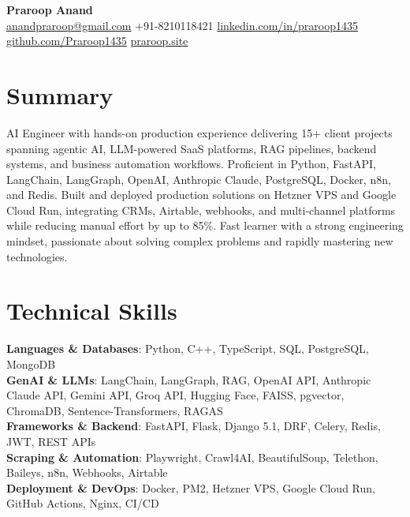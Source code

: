 \documentclass[letterpaper,10pt]{article}
\begin{document}
\begin{center}
  {\LARGE\bfseries Praroop Anand} \\[4pt]
  \small
  \href{mailto:anandpraroop@gmail.com}{anandpraroop@gmail.com} \quad
  +91-8210118421 \quad
  \href{https://www.linkedin.com/in/praroop1435}{linkedin.com/in/praroop1435} \quad
  \href{https://github.com/Praroop1435}{github.com/Praroop1435} \quad
  \href{https://praroop.site}{praroop.site}
\end{center}

\section{Summary}
\vspace{2pt}
\small{AI Engineer with hands-on production experience delivering 15+ client projects spanning agentic AI, LLM-powered SaaS platforms, RAG pipelines, backend systems, and business automation workflows. Proficient in Python, FastAPI, LangChain, LangGraph, OpenAI, Anthropic Claude, PostgreSQL, Docker, n8n, and Redis. Built and deployed production solutions on Hetzner VPS and Google Cloud Run, integrating CRMs, Airtable, webhooks, and multi-channel platforms while reducing manual effort by up to 85\%. Fast learner with a strong engineering mindset, passionate about solving complex problems and rapidly mastering new technologies.}

\section{Technical Skills}
\begin{itemize}[leftmargin=0.15in,label={}]
  \small{\item{
    \textbf{Languages \& Databases}{: Python, C++, TypeScript, SQL, PostgreSQL, MongoDB} \\

    \textbf{GenAI \& LLMs}{: LangChain, LangGraph, RAG, OpenAI API, Anthropic Claude API, Gemini API, Groq API, Hugging Face, FAISS, pgvector, ChromaDB, Sentence-Transformers, RAGAS} \\
    \textbf{Frameworks \& Backend}{: FastAPI, Flask, Django 5.1, DRF, Celery, Redis, JWT, REST APIs} \\
    \textbf{Scraping \& Automation}{: Playwright, Crawl4AI, BeautifulSoup, Telethon, Baileys, n8n, Webhooks, Airtable} \\
    \textbf{Deployment \& DevOps}{: Docker, PM2, Hetzner VPS, Google Cloud Run, GitHub Actions, Nginx, CI/CD} \\
    
  }}
\end{itemize}
\end{document}
